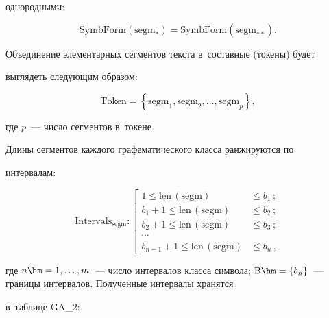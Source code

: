 однородными:


  $$


  \mathrm{SymbForm}\left( \mathrm{segm}_* \right) =\mathrm{SymbForm}\left( 


\mathrm{segm}_{**}\right).


  $$


  


  Объединение элементарных сегментов текста в~составные (токены) будет 


выглядеть следующим образом:


  $$


  \mathrm{Token}= \left\{ \mathrm{segm}_1, \mathrm{segm}_2, \ldots , 


\mathrm{segm}_p\right\},


  $$


где $p$~--- число сегментов в~токене.


  


  Длины сегментов каждого графематического класса ранжируются по 


интервалам:


  $$


  \mathrm{Intervals}_{\mathrm{segm}}:


  \left[


  \begin{array}{rl}


  1\leq \mathrm{len}\,(\mathrm{segm})&\leq b_1\,;\\


  b_1+1\leq \mathrm{len}\,(\mathrm{segm})&\leq b_2\,;\\


  b_2+1\leq \mathrm{len}\,(\mathrm{segm})&\leq b_3\,;\\


  \cdots\\


  b_{n-1}+1\leq \mathrm{len}\,(\mathrm{segm})&\leq b_n\,,


  \end{array}


  \right.


  $$


где $n\hm= 1,\ldots , m$~--- число интервалов класса символа; $\mathrm{B}\hm= \{b_n\}$~--- границы интервалов. Полученные интервалы хранятся 


в~таблице GA\_2: 


$$


